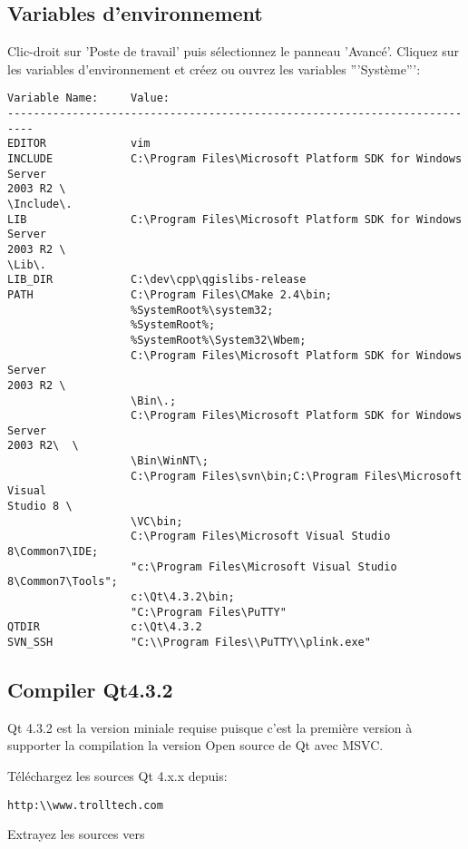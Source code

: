 \subsection{Variables d'environnement}
Clic-droit sur 'Poste de travail' puis sélectionnez le panneau 'Avancé'. Cliquez sur les variables d'environnement et créez ou ouvrez les variables '''Système''':

\begin{verbatim}
Variable Name:     Value:
--------------------------------------------------------------------------
EDITOR             vim
INCLUDE            C:\Program Files\Microsoft Platform SDK for Windows Server
2003 R2 \
\Include\.
LIB                C:\Program Files\Microsoft Platform SDK for Windows Server
2003 R2 \
\Lib\.
LIB_DIR            C:\dev\cpp\qgislibs-release
PATH               C:\Program Files\CMake 2.4\bin;
                   %SystemRoot%\system32;
                   %SystemRoot%;
                   %SystemRoot%\System32\Wbem;
                   C:\Program Files\Microsoft Platform SDK for Windows Server
2003 R2 \
                   \Bin\.;
                   C:\Program Files\Microsoft Platform SDK for Windows Server
2003 R2\  \
                   \Bin\WinNT\;
                   C:\Program Files\svn\bin;C:\Program Files\Microsoft Visual
Studio 8 \
                   \VC\bin;
                   C:\Program Files\Microsoft Visual Studio 8\Common7\IDE;
                   "c:\Program Files\Microsoft Visual Studio 8\Common7\Tools";
                   c:\Qt\4.3.2\bin;
                   "C:\Program Files\PuTTY"
QTDIR              c:\Qt\4.3.2
SVN_SSH            "C:\\Program Files\\PuTTY\\plink.exe"
\end{verbatim}

\subsection{Compiler Qt4.3.2}
Qt 4.3.2 est la version miniale requise puisque c'est la première version à supporter la compilation la version Open source de Qt avec MSVC.

Téléchargez les sources Qt 4.x.x depuis:

\begin{verbatim}
http:\\www.trolltech.com
\end{verbatim}

Extrayez les sources vers 

